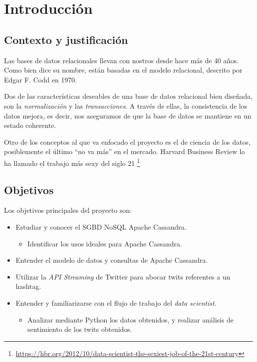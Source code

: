\section{Introducción}
\label{sec:aim}

\subsection{Contexto y justificación}
\label{subsec:context}

Las bases de datos relacionales llevan con nostros desde hace más de 40 años.
Como bien dice su nombre, están basadas en el modelo relacional, descrito por
Edgar F. Codd en 1970.

Dos de las características deseables de una base de datos relacional bien
diseñada, son la \emph{normalización} y las \emph{transacciones}. A través de
ellas, la consistencia de los datos mejora, es decir, nos aseguramos de que la
base de datos se mantiene en un estado coherente. 



Otro de los conceptos al que va enfocado el proyecto es el de ciencia de los
datos, posiblemente el último ``no va más'' en el mercado. Harvard Business
Review lo ha llamado el trabajo más sexy del siglo 21 \footnote{\url{https://hbr.org/2012/10/data-scientist-the-sexiest-job-of-the-21st-century}}


\subsection{Objetivos}
\label{subsec:objectives}

Los objetivos principales del proyecto son:

\begin{itemize}
    \item Estudiar y conocer el SGBD NoSQL Apache Cassandra.
      \begin{itemize}
      \item Identificar los usos ideales para Apache Cassandra.
      \end{itemize}
    \item Entender el modelo de datos y consultas de Apache Cassandra.
    \item Utilizar la \emph{API Streaming} de Twitter para abocar twits
      referentes a un hashtag.
    \item Entender y familiarizarse con el flujo de trabajo del \emph{data scientist}.
      \begin{itemize}
      \item Analizar mediante Python los datos obtenidos, y realizar análisis de
        sentimiento de los twits obtenidos.
      \end{itemize}
\end{itemize}

